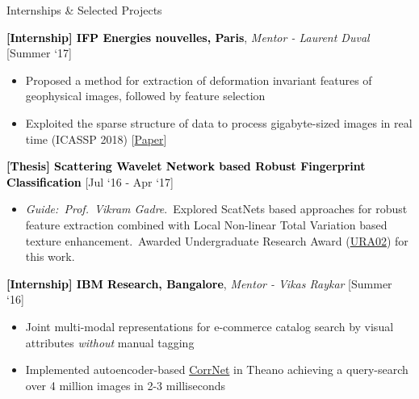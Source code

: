 \documentclass{resume} %
\begin{document}
\begin{rSection}{Internships \& Selected Projects}

\textcolor{Black}{\textbf{[Internship] IFP Energies nouvelles, Paris}}, \textit{Mentor - Laurent Duval} \hfill[Summer `17]\\
\vspace{-16pt}
\begin{itemize}[leftmargin=*]
    \setlength\itemsep{-4pt}
    \item Proposed a method for extraction of deformation invariant features of geophysical images, followed by feature selection
    \item Exploited the sparse structure of data to process gigabyte-sized images in real time (ICASSP 2018) [\href{https://ieeexplore.ieee.org/abstract/document/8462088}{Paper}]
\end{itemize}

\vspace*{3pt}

\textcolor{Black}{\textbf{[Thesis] Scattering Wavelet Network based Robust Fingerprint Classification}} \hfill[Jul `16 - Apr `17]\\
\vspace{-16pt}
\begin{itemize}[leftmargin=*]
    \setlength\itemsep{-2pt}
    \item \textit{Guide:\ Prof.\ Vikram Gadre}.\ Explored ScatNets based approaches for robust feature extraction combined with Local Non-linear Total Variation based texture enhancement.\ Awarded Undergraduate Research Award (\href{http://www.iitb.ac.in/newacadhome/urop.jsp}{URA02}) for this work.
\end{itemize}

\vspace*{3pt}

\textcolor{Black}{\textbf{[Internship] IBM Research, Bangalore}}, \textit{Mentor - Vikas Raykar}  \hfill[Summer `16]\\
\vspace{-16pt}
\begin{itemize}[leftmargin=*]
    \setlength\itemsep{-4pt}
    \item Joint multi-modal representations for e-commerce catalog search by visual attributes \textit{without} manual tagging
    \item Implemented autoencoder-based \href{https://arxiv.org/abs/1504.07225}{CorrNet} in Theano achieving a query-search over 4 million images in 2-3 milliseconds
\end{itemize}


\end{rSection}
\end{document}
